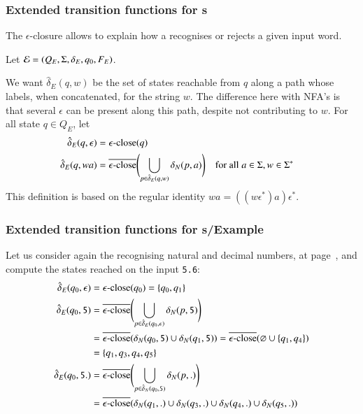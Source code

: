 %
\begin{frame}
\frametitle{Extended transition functions for {\eNFA}s}

The \(\epsilon\)-closure allows to explain how a \eNFA recognises or
rejects a given input word.

\bigskip

Let \({\cal E} = (Q_E, \Sigma, \delta_E, q_0, F_E)\).

\bigskip

We want \(\hat{\delta}_E (q, w)\) be the set of states reachable from
\(q\) along a path whose labels, when concatenated, for the string
\(w\). The difference here with NFA's is that several \(\epsilon\) can
be present along this path, despite not contributing to \(w\).
For all state \(q \in Q_E\), let
\begin{align*}
   \hat{\delta}_E (q, \epsilon)
&= \epsilon\text{-close} (q)\\
   \hat{\delta}_E (q, wa)
&= \overline{\epsilon\text{-close}} \Biggl(\bigcup_{p \in \hat{\delta}_E (q, w)}{\delta_N (p,
     a)}\Biggr)
&& \text{for all} \; a \in \Sigma, w \in \Sigma^{*}
\end{align*}
This definition is based on the regular identity \(wa =
((w\epsilon^{*})a)\epsilon^{*}\).

\end{frame}

%
\begin{frame}[containsverbatim]
\frametitle{Extended transition functions for {\eNFA}s/Example}

Let us consider again the \eNFA recognising natural and decimal
numbers, at page~\pageref{enfa_num}, and compute the states reached on
the input \verb+5.6+:
\begin{align*}
   \hat{\delta}_E (q_0, \epsilon)
&= \epsilon\text{-close} (q_0) = \{q_0, q_1\}\\
   \hat{\delta}_E (q_0, \mathtt{5})
&= \overline{\epsilon\text{-close}} \Biggl( \bigcup_{p \in \hat{\delta}_E (q_0,
   \epsilon)}{\delta_N (p, \mathtt{5})} \Biggr)\\
&= \overline{\epsilon\text{-close}} (\delta_N (q_0, \mathtt{5}) \cup \delta_N (q_1,
   \mathtt{5})) = \overline{\epsilon\text{-close}} (\varnothing \cup \{q_1, q_4\})\\
&= \{q_1, q_3, q_4, q_5\}\\
   \hat{\delta}_E (q_0, \mathtt{5.})
&= \overline{\epsilon\text{-close}} \Biggl( \bigcup_{p \in \hat{\delta}_N (q_0,
   \mathtt{5})}{\delta_N (p, \mathtt{.})} \Biggr)\\
&= \overline{\epsilon\text{-close}} (\delta_N (q_1, \mathtt{.}) \cup \delta_N (q_3,
   \mathtt{.}) \cup \delta_N (q_4, \mathtt{.}) \cup \delta_N (q_5,
   \mathtt{.}))
\end{align*}

\end{frame}

